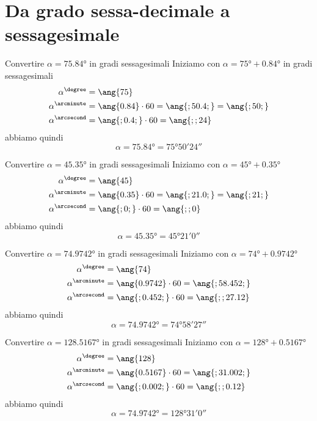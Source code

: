 \section{Da grado sessa-decimale a sessagesimale}
\tcbstartrecording
\begin{exercise}
	Convertire $\alpha=\ang{75.84}$ in gradi sessagesimali
	\tcblower
	Iniziamo con
	$\alpha=\ang{75}+\ang{0.84}$ in gradi sessagesimali
	\begin{align*}
	\alpha^{\degree}&=\ang{75}\\ 
	\alpha^{\arcminute}&=\ang{0.84}\cdot 60=\ang{;50.4;}=\ang{;50;}\\
	\alpha^{\arcsecond}&=\ang{;0.4;}\cdot 60=\ang{;;24}\\
	\end{align*}
	abbiamo quindi
	\[\alpha=\ang{75.84}=\ang{75;50;24}\]
\end{exercise}
\begin{exercise}
Convertire $\alpha=\ang{45.35}$ in gradi sessagesimali
	\tcblower
Iniziamo con 
$\alpha=\ang{45}+\ang{0.35}$
\begin{align*}
\alpha^{\degree}&=\ang{45}\\ 
\alpha^{\arcminute}&=\ang{0.35}\cdot 60=\ang{;21.0;}=\ang{;21;}\\
\alpha^{\arcsecond}&=\ang{;0;}\cdot 60=\ang{;;0}\\
\end{align*}
abbiamo quindi
\[\alpha=\ang{45.35}=\ang{45;21;0}\]
\end{exercise}
\begin{exercise}
	Convertire $\alpha=\ang{74.9742}$ in gradi sessagesimali
	\tcblower
	Iniziamo con 
	$\alpha=\ang{74}+\ang{0.9742}$
	\begin{align*}
	\alpha^{\degree}&=\ang{74}\\ 
	\alpha^{\arcminute}&=\ang{0.9742}\cdot 60=\ang{;58.452;}\\
	\alpha^{\arcsecond}&=\ang{;0.452;}\cdot 60=\ang{;;27.12}\\
	\end{align*}
	abbiamo quindi
	\[\alpha=\ang{74.9742}=\ang{74;58;27}\]
\end{exercise}
\begin{exercise}
	Convertire $\alpha=\ang{128.5167}$ in gradi sessagesimali
	\tcblower
	Iniziamo con 
	$\alpha=\ang{128}+\ang{0.5167}$
	\begin{align*}
	\alpha^{\degree}&=\ang{128}\\ 
	\alpha^{\arcminute}&=\ang{0.5167}\cdot 60=\ang{;31.002;}\\
	\alpha^{\arcsecond}&=\ang{;0.002;}\cdot 60=\ang{;;0.12}\\
	\end{align*}
	abbiamo quindi
	\[\alpha=\ang{74.9742}=\ang{128;31;0}\]
\end{exercise}

